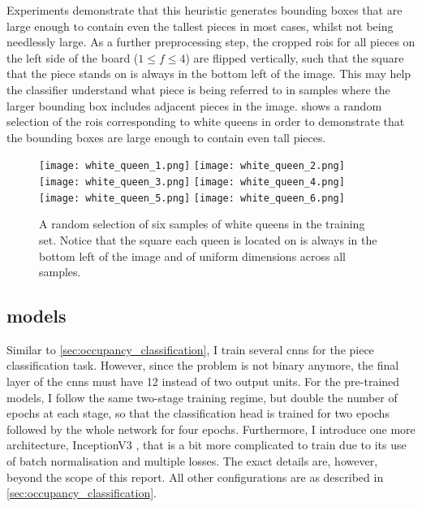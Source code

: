 \documentclass[../report.tex]{subfiles}
\begin{document}
Experiments demonstrate that this heuristic generates bounding boxes that are large enough to contain even the tallest pieces in most cases, whilst not being needlessly large.
As a further preprocessing step, the cropped \glspl{roi} for all pieces on the left side of the board ($1 \leq f \leq 4$) are flipped vertically, such that the square that the piece stands on is always in the bottom left of the image.
This may help the classifier understand what piece is being referred to in samples where the larger bounding box includes adjacent pieces in the image.
 shows a random selection of the \glspl{roi} corresponding to white queens in order to demonstrate that the bounding boxes are large enough to contain even tall pieces.
\begin{figure}
    \centering
    \texttt{[image: white\_queen\_1.png]}
    \texttt{[image: white\_queen\_2.png]}
    \texttt{[image: white\_queen\_3.png]}
    \texttt{[image: white\_queen\_4.png]}
    \texttt{[image: white\_queen\_5.png]}
    \texttt{[image: white\_queen\_6.png]}
    \caption[A random selection of six samples of white queens in the training set.]{A random selection of six samples of white queens in the training set. Notice that the square each queen is located on is always in the bottom left of the image and of uniform dimensions across all samples.}
    \label{fig:white_queens}
\end{figure}

\subsection{ models}
Similar to \cref{sec:occupancy_classification}, I train several \glspl{cnn} for the piece classification task.
However, since the problem is not binary anymore, the final layer of the \glspl{cnn} must have 12 instead of two output units.
For the pre-trained models, I follow the same two-stage training regime, but double the number of epochs at each stage, so that the classification head is trained for two epochs followed by the whole network for four epochs.
Furthermore, I introduce one more architecture, InceptionV3 \cite{szegedy2016}, that is a bit more complicated to train due to its use of batch normalisation and multiple losses.
The exact details are, however, beyond the scope of this report.
All other configurations are as described in \cref{sec:occupancy_classification}.
\end{document}
